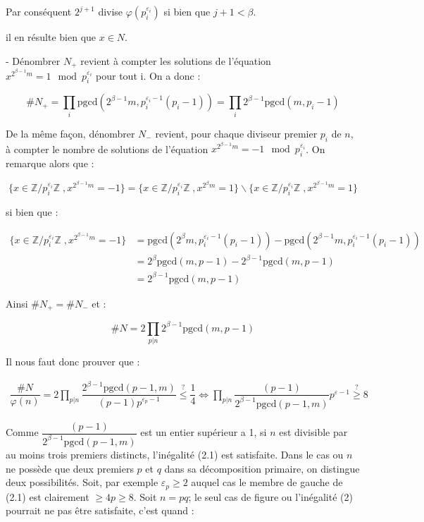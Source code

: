 Par conséquent $2^{j+1}$ divise $\varphi(p_i^{\varepsilon_i})$ si bien que  $j+1<\beta$.

il en résulte bien que $x\in N$. 

- Dénombrer $N_+$ revient à compter les solutions de l'équation $x^{2^{\beta-1}m}=1 \mod p_i^{\varepsilon_i}$ pour tout i. On a donc :

$$\#N_+ = \prod_i \text{pgcd}\left( 2^{\beta -1 }m,p_i^{\varepsilon_i-1}(p_i-1) \right) =\prod_i 2^{\beta-1}\text{pgcd}(m,p_i-1)  $$

De la même façon, dénombrer $N_-$ revient, pour chaque diviseur premier $p_i$ de $n$, à compter le nombre  de solutions  de l'équation $x^{2^{\beta-1}m}=-1 \mod p_i^{\varepsilon_i}$. On remarque alors que :

$$\{x \in \mathbb{Z}/p_i^{\varepsilon_i}\mathbb{Z}\; ,x^{2^{\beta -1}m}=-1 \}=\{x \in \mathbb{Z}/p_i^{\varepsilon_i}\mathbb{Z}\; ,x^{2^{\beta}m}=1 \}\backslash \{x \in \mathbb{Z}/p_i^{\varepsilon_i}\mathbb{Z}\; ,x^{2^{\beta -1}m}=1 \}$$


si bien que :

\begin{align*}
    \{x \in \mathbb{Z}/p_i^{\varepsilon_i}\mathbb{Z}\; ,x^{2^{\beta -1}m}=-1 \}&=\text{pgcd}\left( 2^{\beta  }m,p_i^{\varepsilon_i-1}(p_i-1) \right)-\text{pgcd}\left( 2^{\beta -1 }m,p_i^{\varepsilon_i-1}(p_i-1) \right)\\
    &=2^{\beta}\text{pgcd}(m,p-1)-2^{\beta-1}\text{pgcd}(m,p-1)\\
    &=2^{\beta-1}\text{pgcd}(m,p-1)
\end{align*}

Ainsi $\#N_+=\#N_-$ et :

$$\#N=2\prod_{p|n} 2^{\beta -1}\text{pgcd}(m,p-1)$$

Il nous faut donc prouver que :

\begin{align}
    \dfrac{\#N}{\varphi(n)}=2\prod_{p|n}\dfrac{2^{\beta-1}\text{pgcd}(p-1,m)}{(p-1)p^{\varepsilon_p-1}} \overset{?}{\leq} \dfrac{1}{4} \Leftrightarrow \prod_{p|n}\dfrac{(p-1)}{2^{\beta-1}\text{pgcd}(p-1,m)} p^{\varepsilon-1} \overset{?}{\geq} 8 
\end{align}

Comme $\dfrac{(p-1)}{2^{\beta-1}\text{pgcd}(p-1,m)}$ est un entier supérieur a 1, si $n$ est divisible par au moins trois premiers distincts, l'inégalité (2.1) est satisfaite. Dans le cas ou $n$ ne possède que deux premiers $p$ et $q$ dans sa décomposition primaire, on distingue deux possibilités. Soit, par exemple $\varepsilon_p \geq 2 $ auquel cas le membre de gauche de (2.1) est clairement $\geq 4p \geq 8$.
Soit $n=pq$; le seul cas de figure ou l'inégalité (2) pourrait ne pas être satisfaite, c'est quand :

